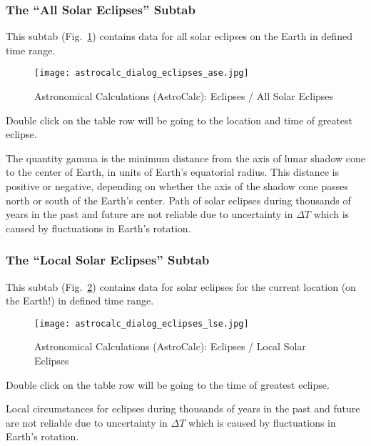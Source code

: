 \subsubsection{The ``All Solar Eclipses'' Subtab}
\label{sec:gui:AstroCalc:Eclipses:AllSolarEclipses}

This subtab (Fig.~\ref{fig:gui:AstroCalc:Eclipses:AllSolarEclipses}) contains data for all solar eclipses on the Earth in defined time range. 

\begin{figure}[htbp]
\centering\texttt{[image: astrocalc\_dialog\_eclipses\_ase.jpg]}
\caption{Astronomical Calculations (AstroCalc): Eclipses / All Solar Eclipses}
\label{fig:gui:AstroCalc:Eclipses:AllSolarEclipses}
\end{figure}

Double click on the table row will be going to the location and time of greatest eclipse.

The quantity gamma is the minimum distance from the axis of lunar shadow cone to the center of Earth, in units of Earth’s equatorial radius. This distance is positive or negative, depending on whether the axis of the shadow cone passes north or south of the Earth's center. Path of solar eclipses during thousands of years in the past and future are not reliable due to uncertainty in $\Delta T$ which is caused by fluctuations in Earth's rotation.

\subsubsection{The ``Local Solar Eclipses'' Subtab}
\label{sec:gui:AstroCalc:Eclipses:LocalSolarEclipses}

This subtab (Fig.~\ref{fig:gui:AstroCalc:Eclipses:LocalSolarEclipses}) contains data for solar eclipses for the current location (on the Earth!) in defined time range. 

\begin{figure}[tbp]
\centering\texttt{[image: astrocalc\_dialog\_eclipses\_lse.jpg]}
\caption{Astronomical Calculations (AstroCalc): Eclipses / Local Solar Eclipses}
\label{fig:gui:AstroCalc:Eclipses:LocalSolarEclipses}
\end{figure}

Double click on the table row will be going to the time of greatest eclipse.

Local circumstances for eclipses during thousands of years in the past and future are not reliable due to uncertainty in $\Delta T$ which is caused by fluctuations in Earth's rotation.

